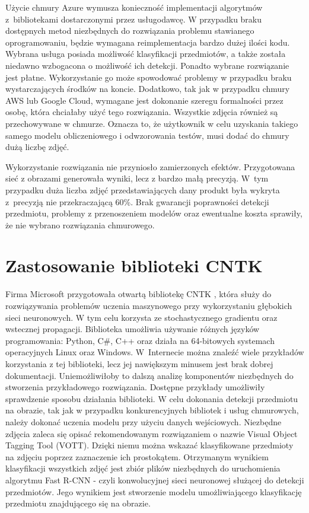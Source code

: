 {Użycie chmury Azure wymusza konieczność implementacji algorytmów z~bibliotekami dostarczonymi przez usługodawcę. W przypadku braku dostępnych metod niezbędnych do rozwiązania problemu stawianego oprogramowaniu, będzie wymagana reimplementacja bardzo dużej ilości kodu. Wybrana usługa posiada możliwość klasyfikacji przedmiotów, a także została niedawno wzbogacona o możliwość ich detekcji. Ponadto wybrane rozwiązanie jest płatne. Wykorzystanie go może spowodować problemy w przypadku braku wystarczających środków na koncie. Dodatkowo, tak jak w przypadku chmury AWS lub Google Cloud, wymagane jest dokonanie szeregu formalności przez osobę, która chciałaby użyć tego rozwiązania. Wszystkie zdjęcia również są przechowywane w chmurze. Oznacza to, że użytkownik w celu uzyskania takiego samego modelu obliczeniowego i odwzorowania testów, musi dodać do chmury dużą liczbę zdjęć. 

Wykorzystanie rozwiązania nie przyniosło zamierzonych efektów. Przygotowana sieć z obrazami generowała wyniki, lecz z bardzo małą precyzją. W~tym przypadku duża liczba zdjęć przedstawiających dany produkt była wykryta z~precyzją nie przekraczającą 60\%. Brak gwarancji poprawności detekcji przedmiotu, problemy z przenoszeniem modelów oraz ewentualne koszta sprawiły, że nie wybrano rozwiązania chmurowego.

\section{Zastosowanie biblioteki CNTK}{
Firma Microsoft przygotowała otwartą bibliotekę CNTK \cite{CNTK}, która służy do rozwiązywania problemów uczenia maszynowego przy wykorzystaniu głębokich sieci neuronowych. W tym celu korzysta ze stochastycznego gradientu oraz wstecznej propagacji. Biblioteka umożliwia używanie różnych języków programowania: Python, C\#, C++ oraz działa na 64-bitowych systemach operacyjnych Linux oraz Windows. W~Internecie można znaleźć wiele przykładów korzystania z tej biblioteki, lecz jej nawiększym minusem jest brak dobrej dokumentacji. Uniemożliwiłoby to dalszą analizę komponentów niezbędnych do stworzenia przykładowego rozwiązania. Dostępne przykłady umożliwiły sprawdzenie sposobu działania biblioteki. W celu dokonania detekcji przedmiotu na obrazie, tak jak w przypadku konkurencyjnych bibliotek i usług chmurowych, należy dokonać uczenia modelu przy użyciu danych wejściowych. Niezbędne zdjęcia zaleca się opisać rekomendowanym rozwiązaniem o nazwie Visual Object Tagging Tool (VOTT)\cite{VOTT}. Dzięki niemu można wskazać klasyfikowane przedmioty na zdjęciu poprzez zaznaczenie ich prostokątem. Otrzymanym wynikiem klasyfikacji wszystkich zdjęć jest zbiór plików niezbędnych do uruchomienia algorytmu Fast R-CNN - czyli konwolucyjnej sieci neuronowej służącej do detekcji przedmiotów. Jego wynikiem jest stworzenie modelu umożliwiającego klasyfikację przedmiotu znajdującego się na obrazie. 

}}
